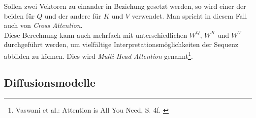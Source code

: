 Sollen zwei Vektoren zu einander in Beziehung gesetzt werden, so wird einer der beiden für $Q$ und der andere für $K$ und $V$ verwendet. Man spricht in diesem Fall auch von \textit{Cross Attention}. \\
Diese Berechnung kann auch mehrfach mit unterschiedlichen $W^Q$, $W^K$ und $W^V$ durchgeführt werden, um vielfältige Interpretationsmöglichkeiten der Sequenz abbilden zu können. Dies wird \textit{Multi-Head Attention} genannt\footnote{
    Vaswani et al.: Attention is All You Need, S. 4f.
    \cite{vaswani2023attentionneed}
}.

\subsection{Diffusionsmodelle}
\label{subsec:Grundlagen_DMs}

